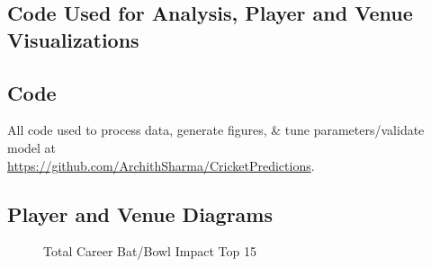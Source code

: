 \documentclass{article}[12pt]
\begin{document}
\begin{appendices}
\section{Code Used for Analysis, Player and Venue Visualizations}
\label{appendix:vis}







\subsection{Code}
\label{appendix:vis1}
All code used to process data, generate figures, \& tune parameters/validate model at \\ \href{https://github.com/ArchithSharma/CricketPredictions}{https://github.com/ArchithSharma/CricketPredictions}. 

\subsection{Player and Venue Diagrams}
\label{appendix:vis2}
\begin{figure}[!htb]
    \centering
    \qquad
    \caption{Total Career Bat/Bowl Impact Top 15}%
    \label{fig:career}%
\end{figure}


\end{appendices}
\end{document}
